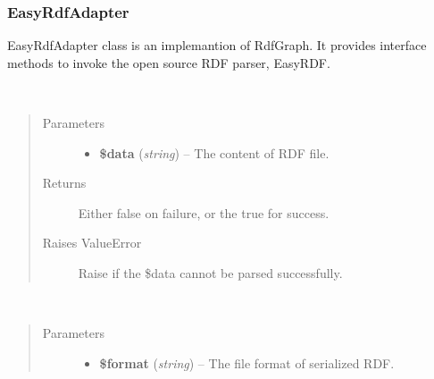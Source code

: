 \documentclass[letterpaper,10pt,english]{sphinxmanual}
\begin{document}
\subsubsection{EasyRdfAdapter}
\label{docs/api:easyrdfadapter}

\begin{fulllineitems}
\label{docs/api:EasyRdfAdapter}
EasyRdfAdapter class is an implemantion of RdfGraph. It provides interface methods to invoke the open source RDF parser, EasyRDF.

\begin{fulllineitems}
\label{docs/api:EasyRdfAdapter::parseRdf}~\begin{quote}\begin{description}
\item[{Parameters}] \leavevmode\begin{itemize}
\item {} 
\textbf{\$data} (\emph{string}) -- The content of RDF file.

\end{itemize}

\item[{Returns}] \leavevmode
Either false on failure, or the true for success.

\item[{Raises ValueError}] \leavevmode
Raise if the \$data cannot be parsed successfully.

\end{description}\end{quote}

\end{fulllineitems}


\begin{fulllineitems}
\label{docs/api:EasyRdfAdapter::serializeRdfAs}~\begin{quote}\begin{description}
\item[{Parameters}] \leavevmode\begin{itemize}
\item {} 
\textbf{\$format} (\emph{string}) -- The file format of serialized RDF.


\end{itemize}
\end{description}
\end{quote}
\end{fulllineitems}
\end{fulllineitems}
\end{document}

